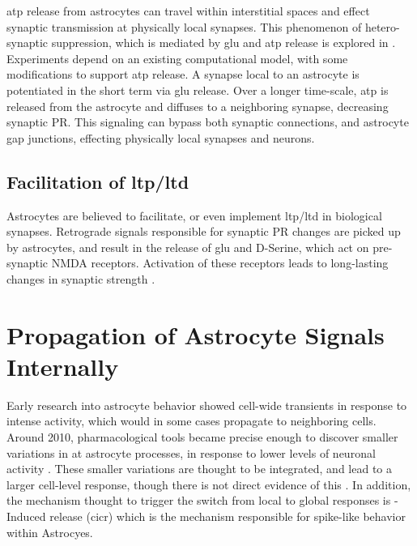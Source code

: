     \Gls{atp} release from astrocytes can travel within interstitial spaces and
    effect synaptic transmission at physically local synapses. This phenomenon
    of hetero-synaptic suppression, which is mediated by \gls{glu} and \gls{atp}
    release is explored in \parencite{postnov_2009}. Experiments depend on an
    existing computational model, with some modifications to support \gls{atp}
    release. A synapse local to an astrocyte is potentiated in the short term
    via \gls{glu} release. Over a longer time-scale, \gls{atp} is released from
    the astrocyte and diffuses to a neighboring synapse, decreasing synaptic
    PR. This signaling can bypass both synaptic connections, and astrocyte gap
    junctions, effecting physically local synapses and neurons.

    \subsection{Facilitation of \Gls{ltp}/\Gls{ltd}}
    Astrocytes are believed to facilitate, or even implement \gls{ltp}/\gls{ltd} in
    biological synapses. Retrograde signals responsible for synaptic PR changes
    are picked up by astrocytes, and result in the release of \gls{glu} and D-Serine,
    which act on pre-synaptic NMDA receptors. Activation of these receptors
    leads to long-lasting changes in synaptic strength \parencite{min_2012}.

    \section{Propagation of Astrocyte Signals Internally}
    Early research into astrocyte behavior showed cell-wide \ca transients in
    response to intense activity, which would in some cases propagate to
    neighboring cells. Around 2010, pharmacological tools became precise enough
    to discover smaller variations in \ca at astrocyte processes, in response to
    lower levels of neuronal activity \parencite{manninen_2018}. These smaller
    variations are thought to be integrated, and lead to a larger cell-level \ca
    response, though there is not direct evidence of this
    \parencite{araque_2014}. In addition, the mechanism thought to trigger the
    switch from local to global responses is \ca-Induced \ca release
    (\gls{cicr}) which is the mechanism responsible for spike-like behavior
    within Astrocyes.


